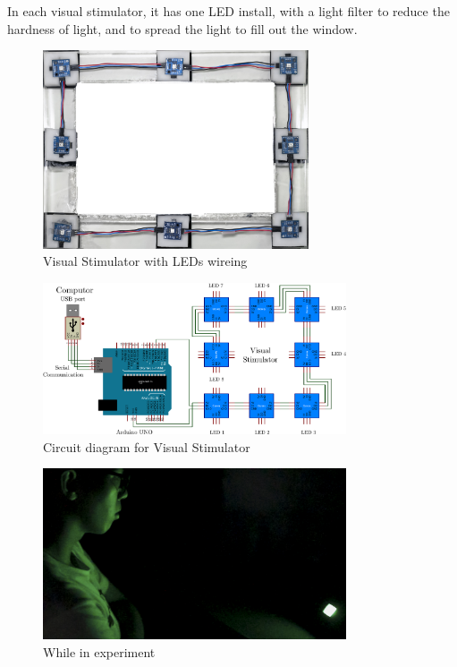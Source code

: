 In each visual stimulator, it has one LED install, with a light filter to reduce the hardness of light, and to spread the light to fill out the window.
\begin{figure}[H]
	\centering
	\includegraphics[width=0.7\textwidth]{chapter6/frame_LED.jpg}
	\caption{Visual Stimulator with LEDs wireing}
\end{figure}
\pagebreak
\begin{figure}[H]
	\centering
	\includegraphics[width=0.8\textwidth]{chapter6/arduinosheet.pdf}
	\caption{Circuit diagram for Visual Stimulator}
\end{figure}
\begin{figure}[H]
	\centering
	\includegraphics[width=0.8\textwidth]{chapter6/experi.jpg}
	\caption{While in experiment}
\end{figure}
